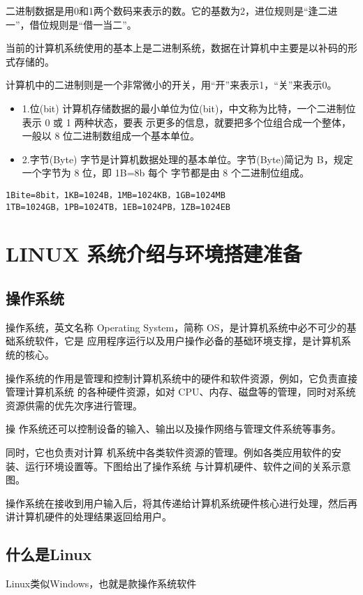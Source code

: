 二进制数据是用0和1两个数码来表示的数。它的基数为2，进位规则是“逢二进一”，借位规则是“借一当二”。

当前的计算机系统使用的基本上是二进制系统，数据在计算机中主要是以补码的形式存储的。

计算机中的二进制则是一个非常微小的开关，用“开”来表示1，“关”来表示0。
\begin{itemize}
	\item 1.位(bit) 计算机存储数据的最小单位为位(bit)，中文称为比特，一个二进制位表示 0 或 1 两种状态，要表 示更多的信息，就要把多个位组合成一个整体，一般以 8 位二进制数组成一个基本单位。
	\item 2.字节(Byte) 字节是计算机数据处理的基本单位。字节(Byte)简记为 B，规定一个字节为 8 位，即 1B=8b 每个 字节都是由 8 个二进制位组成。
\end{itemize}

\begin{lstlisting}[style=text]
1Bite=8bit，1KB=1024B，1MB=1024KB，1GB=1024MB
1TB=1024GB，1PB=1024TB，1EB=1024PB，1ZB=1024EB
\end{lstlisting}	

\section{LINUX 系统介绍与环境搭建准备}
\subsection{操作系统}
操作系统，英文名称 Operating System，简称 OS，是计算机系统中必不可少的基础系统软件，它是 应用程序运行以及用户操作必备的基础环境支撑，是计算机系统的核心。

操作系统的作用是管理和控制计算机系统中的硬件和软件资源，例如，它负责直接管理计算机系统 的各种硬件资源，如对 CPU、内存、磁盘等的管理，同时对系统资源供需的优先次序进行管理。

操 作系统还可以控制设备的输入、输出以及操作网络与管理文件系统等事务。

同时，它也负责对计算 机系统中各类软件资源的管理。例如各类应用软件的安装、运行环境设置等。下图给出了操作系统 与计算机硬件、软件之间的关系示意图。


操作系统在接收到用户输入后，将其传递给计算机系统硬件核心进行处理，然后再讲计算机硬件的处理结果返回给用户。

\subsection{什么是Linux}
Linux类似Windows，也就是款操作系统软件

